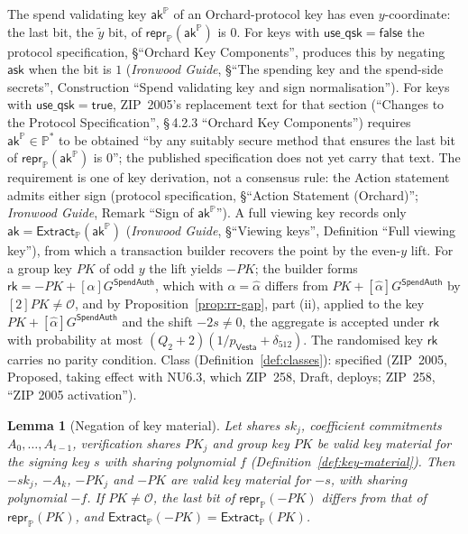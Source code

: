 \documentclass[11pt,a4paper]{article}
\newtheorem{lemma}[theorem]{Lemma}
\theoremstyle{definition}
\newcommand{\PP}{\mathbb{P}}
\newcommand{\rk}{\mathsf{rk}}
\newcommand{\Vesta}{\ensuremath{\mathsf{Vesta}}}
\newcommand{\Extract}{\ensuremath{\mathsf{Extract}}}
\newcommand{\ask}{\ensuremath{\mathsf{ask}}}
\newcommand{\aksym}{\ensuremath{\mathsf{ak}}}
\begin{document}
The spend validating key \(\aksym^{\PP}\) of an Orchard-protocol key has
even \(y\)-coordinate: the last bit, the \(\tilde{y}\) bit, of
\(\mathsf{repr}_{\PP}(\aksym^{\PP})\) is \(0\). For keys with
\(\mathsf{use\_qsk} = \mathsf{false}\) the protocol specification,
\S``Orchard Key Components'', produces this by negating \(\ask\) when the
bit is \(1\) (\emph{Ironwood Guide}, \S``The spending key and the spend-side
secrets'', Construction ``Spend validating key and sign normalisation''). For
keys with \(\mathsf{use\_qsk} = \mathsf{true}\), ZIP~2005's replacement text
for that section (``Changes to the Protocol Specification'', \S\,4.2.3
``Orchard Key Components'') requires
\(\aksym^{\PP} \in \PP^{*}\) to be obtained ``by any suitably secure method
that ensures the last bit of \(\mathsf{repr}_{\PP}(\aksym^{\PP})\) is
\(0\)''; the published specification does not yet carry that text. The
requirement is one of key derivation, not a consensus rule: the Action
statement admits either sign (protocol specification, \S``Action Statement
(Orchard)''; \emph{Ironwood Guide}, Remark ``Sign of \(\aksym^{\PP}\)''). A
full viewing key records only \(\aksym = \Extract_{\PP}(\aksym^{\PP})\)
(\emph{Ironwood Guide}, \S``Viewing keys'', Definition ``Full viewing key''),
from which a transaction builder recovers the point by the even-\(y\) lift.
For a group key \(\mathit{PK}\) of odd \(y\) the lift yields
\(-\mathit{PK}\); the builder forms
\(\rk = -\mathit{PK} + [\alpha]G^{\mathsf{SpendAuth}}\), which with
\(\alpha = \hat{\alpha}\) differs from \(\mathit{PK} +
[\hat{\alpha}]G^{\mathsf{SpendAuth}}\) by \([2]\mathit{PK} \ne \mathcal{O}\),
and by Proposition~\ref{prop:rr-gap}, part (ii), applied to the key
\(\mathit{PK} + [\hat{\alpha}]G^{\mathsf{SpendAuth}}\) and the shift \(-2s \ne
0\), the aggregate is accepted under \(\rk\) with probability at most \((Q_2 +
2)(1/p_{\Vesta} + \delta_{512})\). The randomised key \(\rk\) carries no parity
condition. Class (Definition~\ref{def:classes}): specified (ZIP~2005, Proposed,
taking effect with NU6.3, which ZIP~258, Draft, deploys; ZIP~258, ``ZIP 2005
activation'').

\begin{lemma}[Negation of key material]\label{lem:negate}
Let shares \(\mathit{sk}_j\), coefficient commitments
\(A_0, \dots, A_{t-1}\), verification shares \(\mathit{PK}_j\) and group key
\(\mathit{PK}\) be valid key material for the signing key \(s\) with sharing
polynomial \(f\) (Definition~\ref{def:key-material}). Then
\(-\mathit{sk}_j\), \(-A_k\), \(-\mathit{PK}_j\) and \(-\mathit{PK}\) are
valid key material for \(-s\), with sharing polynomial \(-f\). If
\(\mathit{PK} \ne \mathcal{O}\), the last bit of
\(\mathsf{repr}_{\PP}(-\mathit{PK})\) differs from that of
\(\mathsf{repr}_{\PP}(\mathit{PK})\), and
\(\Extract_{\PP}(-\mathit{PK}) = \Extract_{\PP}(\mathit{PK})\).
\end{lemma}
\end{document}
